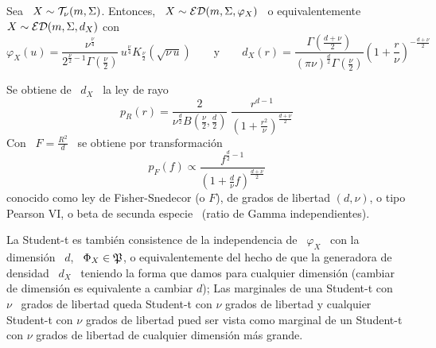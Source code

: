 \begin{ejemplo}
%
  Sea \ $X \sim \mathcal{T}_\nu(m,\Sigma)$.  Entonces, \ $X \sim \mathcal{ED}(m,\Sigma,\varphi_X)$
  \ o equivalentemente \ $X \sim \mathcal{ED}(m,\Sigma,d_X)$ con
  \[
  \varphi_X(u)   =  \frac{\nu^{\frac{\nu}{4}}}{2^{\frac{\nu}{2}-1}  \Gamma\left(
      \frac{\nu}{2}   \right)}   \,  u^{\frac{\nu}{4}}   K_{\frac{\nu}{2}}\left(
    \sqrt{\nu \,  u} \right) \qquad \mbox{y} \qquad  d_X(r) = \frac{\Gamma\left(
      \frac{d+\nu}{2}     \right)}{(\pi     \nu)^{\frac{d}{2}}     \Gamma\left(
      \frac{\nu}{2}    \right)}   \left(    1    +   \frac{r}{\nu}    \right)^{-
    \frac{d+\nu}{2}}
  \]

  Se obtiene de \ $d_X$ \ la ley de rayo
  \[
  p_R(r)  =  \frac{2}{\nu^{\frac{d}{2}}   B\left(  \frac{\nu}{2}  ,  \frac{d}{2}
    \right)} \:
  \frac{r^{d-1}}{\left( 1 + \frac{r^2}{\nu} \right)^{\frac{d+\nu}{2}}}
  \]
  Con \ $F = \frac{R^2}{d}$ \ se obtiene por transformaci\'on
  \[
  p_F(f)   \propto   \frac{f^{\frac{d}{2}-1}}{\left(   1   +   \frac{d}{\nu}   f
    \right)^{\frac{d+\nu}{2}}}
  \]
  conocido como ley de Fisher-Snedecor (o $F$), de grados de libertad $(d,\nu)$,
  o tipo Pearson VI, o  beta de secunda especie~\cite{JohKot95:v2, Muk00, Bre88,
    IbaPer12} (ratio de Gamma independientes).

  La Student-t es  tambi\'en consistence de la independencia  de \ $\varphi_X$ \
  con la dimensi\'on \ $d$, \  $\Phi_X \in \mathfrak{P}$, o equivalentemente del hecho de
  que  la generadora de  densidad \  $d_X$ \  teniendo la  forma que  damos para
  cualquier dimensi\'on  (cambiar de dimensi\'on es equivalente  a cambiar $d$);
  Las  marginales de  una  Student-t con  \  $\nu$ \  grados  de libertad  queda
  Student-t con $\nu$ grados de  libertad y cualquier Student-t con $\nu$ grados
  de libertad pued  ser vista como marginal de un Student-t  con $\nu$ grados de
  libertad de cualquier dimensi\'on m\'as grande.

\end{ejemplo}

